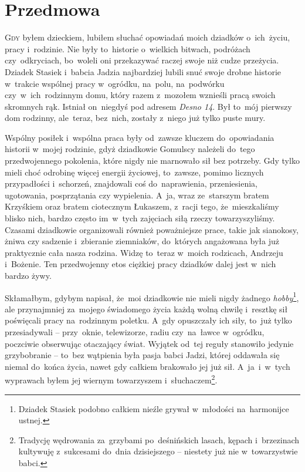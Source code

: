 
\cleardoublepage
\chapter*{Przedmowa}
\thispagestyle{plain}


\lettrine{G}{dy} byłem dzieckiem, lubiłem słuchać opowiadań moich dziadków
o~ich~życiu, pracy i~rodzinie. Nie były to~historie o~wielkich bitwach,
podróżach czy~odkryciach, bo~woleli oni przekazywać raczej swoje niż cudze
przeżycia. Dziadek Stasiek
i~babcia Jadzia
najbardziej lubili snuć swoje drobne historie w~trakcie wspólnej pracy
w~ogródku, na~polu, na~podwórku czy~w~ich~rodzinnym domu, który razem 
z~mozołem wznieśli pracą swoich skromnych rąk. Istniał on~niegdyś pod
adresem \emph{Desno 14}. Był to~mój pierwszy dom rodzinny, ale~teraz,
bez~nich, zostały z~niego już tylko puste mury.

Wspólny posiłek i~wspólna praca były od~zawsze kluczem do~opowiadania historii
w~mojej rodzinie, gdyż dziadkowie Gomulscy należeli do~tego przedwojennego
pokolenia, które nigdy nie marnowało sił bez potrzeby. Gdy tylko mieli choć
odrobinę więcej energii życiowej, to~zawsze, pomimo licznych przypadłości
i~schorzeń, znajdowali coś do~naprawienia, przeniesienia, ugotowania,
posprzątania czy wypielenia. A~ja,
wraz ze~starszym bratem Krzyśkiem 
oraz bratem ciotecznym Łukaszem,
z~racji tego, że~mieszkaliśmy blisko nich, bardzo często im~w~tych zajęciach
siłą rzeczy towarzyszyliśmy. Czasami dziadkowie organizowali również
poważniejsze prace, takie jak sianokosy, żniwa czy sadzenie i~zbieranie
ziemniaków, do~których angażowana była już praktycznie cała nasza rodzina.
Widzę to~teraz w~moich rodzicach,
Andrzeju
i~Bożenie. Ten
przedwojenny etos ciężkiej pracy dziadków dalej jest w~nich bardzo żywy.

Skłamałbym, gdybym napisał, że~moi dziadkowie nie mieli nigdy żadnego 
\emph{hobby}\footnote{Dziadek Stasiek podobno całkiem nieźle grywał w~młodości
na~harmonijce ustnej.}, ale przynajmniej za~mojego świadomego życia każdą
wolną chwilę i~resztkę sił poświęcali pracy na~rodzinnym poletku. A~gdy
opuszczały ich siły, to~już tylko przesiadywali -- przy~oknie, telewizorze,
radiu czy~na~ławce w~ogródku, poczciwie obserwując otaczający świat. Wyjątek
od~tej reguły stanowiło jedynie grzybobranie -- to~bez wątpienia była pasja
babci Jadzi, której oddawała się niemal do~końca życia, nawet gdy całkiem
brakowało jej już sił. A~ja~i~w~tych wyprawach byłem jej wiernym towarzyszem
i~słuchaczem\footnote{Tradycję wędrowania za~grzybami po~deśnińskich lasach,
kępach i~brzezinach kultywuję z~sukcesami do~dnia dzisiejszego -- niestety już
nie w~towarzystwie babci.}.

